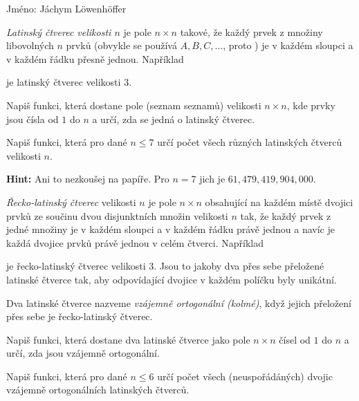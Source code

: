 \documentclass{exam}
\begin{document}
Jméno: Jáchym Löwenhöffer
\begin{questions}
	\question[0.1]
	\emph{Latinský čtverec velikosti $n$} je pole $n \times n$ takové, že každý
 prvek z množiny libovolných $n$ prvků (obvykle se používá $A,B,C,\ldots$, proto
 ) je v každém sloupci a v každém řádku přesně jednou. Například
 \begin{center}
  \begin{logicpuzzle}[rows=3,columns=3]
  \end{logicpuzzle}
 \end{center}
 je latinský čtverec velikosti $3$.

 Napiš funkci, která dostane pole (seznam seznamů) velikosti $n \times n$,
 kde prvky jsou čísla od $1$ do $n$ a určí, zda se jedná o latinský čtverec.

 Napiš funkci, která pro dané $n \leq 7$ určí počet všech různých latinských
 čtverců velikosti $n$.

 \textbf{Hint:} Ani to nezkoušej na papíře. Pro $n = 7$ jich je
 $61,479,419,904,000$.

 \question[0.001]
 \emph{Řecko-latinský čtverec} velikosti $n$ je pole $n \times n$ obsahující na
 každém místě dvojici prvků ze součinu dvou disjunktních množin velikosti $n$
 tak, že každý prvek z jedné množiny je v každém sloupci a v každém řádku právě
 jednou a navíc je každá dvojice prvků právě jednou v celém čtverci. Například
 \begin{center}
  \begin{logicpuzzle}[rows=3,columns=3]
  \end{logicpuzzle}
 \end{center}
 je řecko-latinský čtverec velikosti $3$. Jsou to jakoby dva přes sebe přeložené
 latinské čtverce tak, aby odpovídající dvojice v každém políčku byly unikátní.

 Dva latinské čtverce nazveme \emph{vzájemně ortogonální (kolmé)}, když jejich
 přeložení přes sebe je řecko-latinský čtverec.

 Napiš funkci, která dostane dva latinské čtverce jako pole $n \times n$ 
 čísel od $1$ do $n$ a určí, zda jsou vzájemně ortogonální.

 Napiš funkci, která pro dané $n \leq 6$ určí počet všech (neuspořádáných)
 dvojic vzájemně ortogonálních latinských čtverců.
\end{questions}
\end{document}

